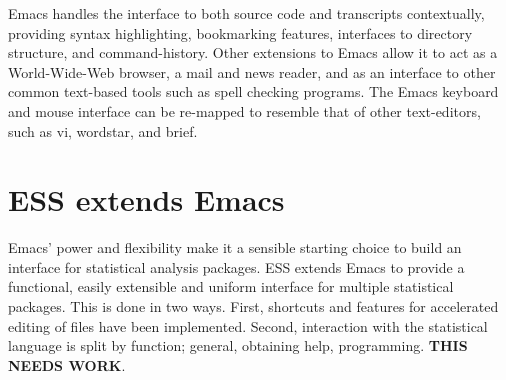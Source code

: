 \documentclass{article}
\newcommand{\stexttt}[1]{{\small\texttt{#1}}}
\begin{document}

Emacs handles the
interface to both source code and transcripts contextually, providing
syntax highlighting, bookmarking features, interfaces to directory
structure, and command-history.  Other extensions to Emacs allow it to
act as a World-Wide-Web browser, a mail and news
reader, and as an interface to
other common text-based tools such as spell checking programs.  The
Emacs keyboard and mouse interface can be re-mapped to resemble that
of other text-editors, such as vi, wordstar, and brief.


\section{ESS extends Emacs}
\label{sec:ess-extends-emacs}

Emacs' power and flexibility make it a sensible starting choice to
build an interface for statistical analysis packages.  ESS extends
Emacs to provide a functional, easily extensible and uniform interface
for multiple statistical packages.  This is done in two ways.  First,
shortcuts and features for accelerated editing of files have been
implemented.  Second, interaction with the statistical
language is split by function; general, obtaining help, programming.
\textbf{THIS NEEDS WORK}.



\end{document}
